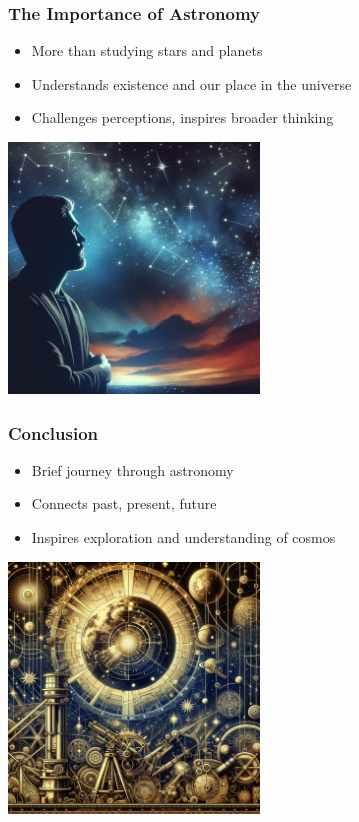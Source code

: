 \documentclass{beamer}
\begin{document}
\begin{frame}
    \frametitle{The Importance of Astronomy}
    \begin{itemize}
        \item More than studying stars and planets
        \item Understands existence and our place in the universe
        \item Challenges perceptions, inspires broader thinking
    \end{itemize}
    \centering
    \includegraphics[width=0.5\textwidth]{./images/importance_astronomy.png}
\end{frame}

\begin{frame}
    \frametitle{Conclusion}
    \begin{itemize}
        \item Brief journey through astronomy
        \item Connects past, present, future
        \item Inspires exploration and understanding of cosmos
    \end{itemize}
    \centering
    \includegraphics[width=0.5\textwidth]{./images/conclusion.png}
\end{frame}
\end{document}
